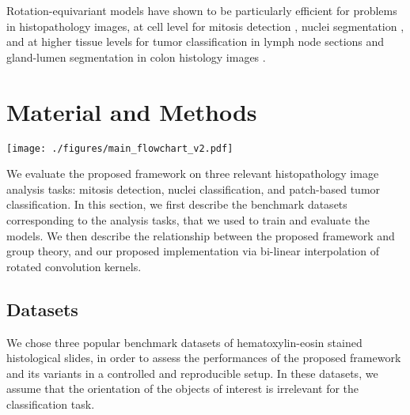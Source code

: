 \documentclass[twocolumn,final]{article}
\newcommand{\se}[1]{\textit{SE(#1)}}
\newcommand{\mset}[2]{$\mathbb{#1}^{#2}$}
\begin{document}
Rotation-equivariant models have shown to be particularly efficient for problems in histopathology images, at cell level for mitosis detection \citep{bekkers2018roto}, nuclei segmentation \citep{chidester2019nuclear}, and at higher tissue levels for tumor classification in lymph node sections \citep{veeling2018rotation} and gland-lumen segmentation in colon histology images \citep{graham2019rota}.


\section{Material and Methods}

\begin{figure*}[ht!]
\begin{center}
\texttt{[image: ./figures/main\_flowchart\_v2.pdf]}
\end{center}
\caption{
\footnotesize
Illustration of the three types of layers investigated in our G-CNNs.
The \textit{lifting layer} uses a set of rotated kernels in \mset{R}{2} to output an activation map that is an image on \se{2}.
The \textit{\se{2} group convolution layer} applies a \textit{shift-twist convolution} via a set of rotated-and-shifted kernels in \se{2} to output a \se{2}-image activation map (red border highlights the kernel transformation, cyan border highlights the output of a \se{2} kernel).
The \textit{projection layer} transforms an input \se{2}-image onto \mset{R}{2} via a rotation-invariant operation (pixel-wise maximum projection is used here).
A 3-channel input is shown for the \se{2} group convolution layer and 1-channel outputs are shown for all the layers: this is done for illustrative purposes but more channels are used in practice.
The example images used for the examples are extracted from a trained nuclei segmentation model with a 8-fold discretization of \se{2}.
}
\label{fig:mainFlowchart}
\end{figure*}

We evaluate the proposed framework on three relevant histopathology image analysis tasks: mitosis detection, nuclei classification, and patch-based tumor classification.
In this section, we first describe the benchmark datasets corresponding to the analysis tasks, that we used to train and evaluate the models.
We then describe the relationship between the proposed framework and group theory, and our proposed implementation via bi-linear interpolation of rotated convolution kernels.


\subsection{Datasets}
\label{datasets}
We chose three popular benchmark datasets of hematoxylin-eosin stained histological slides, in order to assess the performances of the proposed framework and its variants in a controlled and reproducible setup.
In these datasets, we assume that the orientation of the objects of interest is irrelevant for the classification task.
\end{document}
